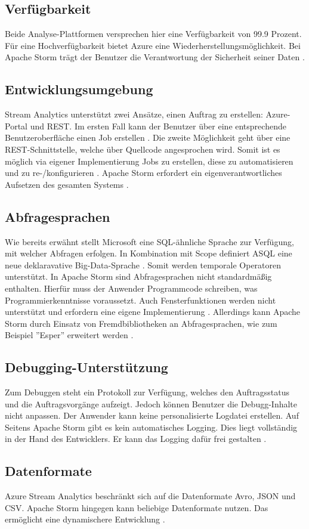 \subsection{Verfügbarkeit}
Beide Analyse-Plattformen versprechen hier eine Verfügbarkeit von 99.9 Prozent. Für eine Hochverfügbarkeit bietet Azure eine Wiederherstellungsmöglichkeit. Bei Apache Storm  trägt der Benutzer die Verantwortung der Sicherheit seiner Daten \cite{samacha.2017} \cite{apachescale.2017}. 

\subsection{Entwicklungsumgebung}
Stream Analytics unterstützt zwei Ansätze, einen Auftrag zu erstellen: Azure-Portal und REST. Im ersten Fall kann der Benutzer über eine entsprechende Benutzeroberfläche einen Job erstellen \cite{jeffstokes72.19.12.2017}. Die zweite Möglichkeit geht über eine REST-Schnittstelle, welche über Quellcode angesprochen wird. Somit ist es möglich via eigener Implementierung Jobs zu erstellen, diese zu automatisieren und zu re-/konfigurieren \cite{samacha.19.12.2017}. Apache Storm erfordert ein eigenverantwortliches Aufsetzen des gesamten Systems \cite{apache.2017}. 

\subsection{Abfragesprachen} \label{absprache}
Wie bereits erwähnt stellt Microsoft eine SQL-ähnliche Sprache zur Verfügung, mit welcher Abfragen erfolgen. In Kombination mit Scope definiert ASQL eine neue deklaravative Big-Data-Sprache \cite{sql.2016}. Somit werden temporale Operatoren unterstützt. In Apache Storm sind Abfragesprachen nicht standardmäßig enthalten. Hierfür muss der Anwender Programmcode schreiben, was Programmierkenntnisse voraussetzt. Auch Fensterfunktionen werden nicht unterstützt und erfordern eine eigene Implementierung \cite{samacha.2017}. Allerdings kann Apache Storm durch Einsatz von Fremdbibliotheken an Abfragesprachen, wie zum Beispiel ''Esper'' erweitert werden \cite{esper.2016}.

\subsection{Debugging-Unterstützung} \label{Debugging}
Zum Debuggen steht ein Protokoll zur Verfügung, welches den Auftragsstatus und die Auftragsvorgänge aufzeigt. Jedoch können Benutzer die Debugg-Inhalte nicht anpassen. Der Anwender kann keine personalisierte Logdatei erstellen. Auf Seitens Apache Storm gibt es kein automatisches Logging. Dies liegt vollständig in der Hand des Entwicklers. Er kann das Logging dafür frei gestalten \cite{apachedebugging.2106}.

\subsection{Datenformate}
Azure Stream Analytics beschränkt sich auf die Datenformate Avro, JSON und CSV. Apache Storm hingegen kann beliebige Datenformate nutzen. Das ermöglicht eine dynamischere Entwicklung \cite{Klein.2017}. 

